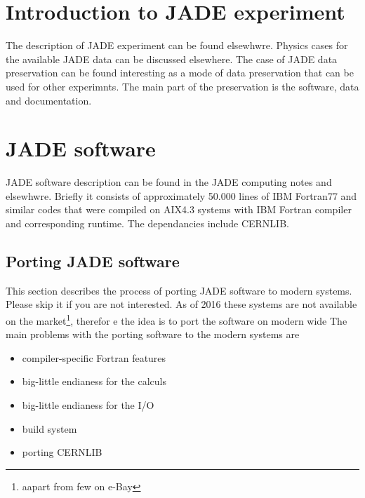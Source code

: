 \section{Introduction to JADE experiment}
The description of JADE experiment can be found elsewhwre.\cite{Bartel:1986ua}
Physics cases for the available JADE data can be discussed elsewhere\cite{Bartel:1986ua}.
The case of JADE data preservation can be found interesting as a mode of data preservation that can be used for other experimnts.
The main part of the preservation is the  software, data and documentation.
\section{JADE software}
JADE software description can be found in the JADE computing notes and elsewhwre.
Briefly it consists of approximately 50.000 lines of IBM Fortran77 and similar codes 
that were compiled on AIX4.3 systems with IBM Fortran compiler and corresponding runtime.
The dependancies include CERNLIB.


\subsection{Porting JADE software}
This section describes the process of porting JADE software to modern systems.
Please skip it if you are not interested.
As of 2016 these systems are not available on the market\footnote{aapart from few on e-Bay},
therefor e the idea is to port the software on modern wide 
The main problems with the porting software to the modern systems are
\begin{itemize}
\item  compiler-specific Fortran features
\item  big-little endianess for the calculs
\item  big-little endianess for the I/O
\item  build system 
\item  porting CERNLIB
\end{itemize}

